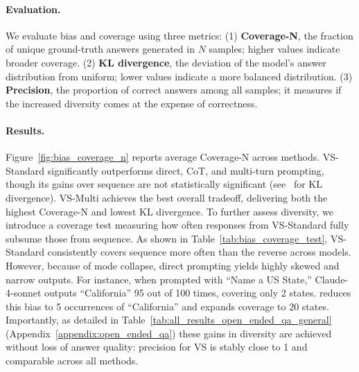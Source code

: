 \paragraph{Evaluation.}
We evaluate bias and coverage using three metrics: (1) \textbf{Coverage-N}, the fraction of unique ground-truth answers generated in $N$ samples; higher values indicate broader coverage. (2) \textbf{KL divergence}, the deviation of the model's answer distribution from uniform; %
lower values indicate a more balanced distribution. (3) \textbf{Precision}, the proportion of correct answers among all samples; it measures if the increased diversity comes at the expense of correctness. 

\paragraph{Results.}
Figure~\ref{fig:bias_coverage_n} reports average Coverage-N across methods. VS-Standard significantly outperforms direct, CoT, and multi-turn prompting, though its gains over sequence are not statistically significant (see~ for KL divergence). VS-Multi achieves the best overall tradeoff, delivering both the highest Coverage-N and lowest KL divergence. 
To further assess diversity, we introduce a coverage test measuring how often responses from VS-Standard fully subsume those from sequence. As shown in Table~\ref{tab:bias_coverage_test}, VS-Standard consistently covers sequence more often than the reverse across models.
However, because of mode collapse, direct prompting yields highly skewed and narrow outputs. For instance, when prompted with ``Name a US State,'' Claude-4-sonnet outputs ``California'' 95 out of 100 times, covering only 2 states. \ours reduces this bias to 5 occurrences of ``California'' and expands coverage to 20 states.
Importantly, as detailed in Table~\ref{tab:all_results_open_ended_qa_general} (Appendix~\ref{appendix:open_ended_qa}) these gains in diversity are achieved without loss of answer quality: precision for VS is stably close to 1 and comparable across all methods.


